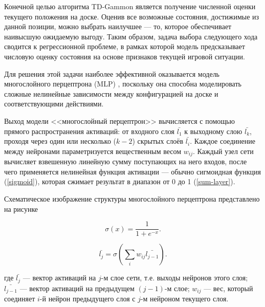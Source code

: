 Конечной целью алгоритма TD-Gammon является получение численной оценки текущего положения на доске. Оценив все возможные состояния, достижимые из данной позиции, можно выбрать наилучшее --- то, которое обеспечивает наивысшую ожидаемую выгоду. Таким образом, задача выбора следующего хода сводится к регрессионной проблеме, в рамках которой модель предсказывает числовую оценку состояния на основе признаков текущей игровой ситуации.

Для решения этой задачи наиболее эффективной оказывается модель многослойного перцептрона (MLP) \cite{mlp}, поскольку она способна моделировать сложные нелинейные зависимости между конфигурацией на доске и соответствующими действиями.

Выход модели <<многослойный перцептрон>> вычисляется с помощью прямого распространения активаций: от входного слоя $\bar{l_1}$ к выходному слою $\bar{l_k}$, проходя через один или несколько ($k - 2$) скрытых слоёв $\bar{l_i}$. Каждое соединение между нейронами параметризуется вещественным весом $w_{ij}$. Каждый узел сети вычисляет взвешенную линейную сумму поступающих на него входов, после чего применяется нелинейная функция активации --- обычно сигмоидная функция (\ref{sigmoid}), которая сжимает результат в диапазон от 0 до 1 (\ref{sum-layer}).

Схематическое изображение структуры многослойного перцептрона представлено на рисунке 


\begin{equation}\label{sigmoid}
    \sigma(x) = \frac{1}{1 + e^{-x}}.
\end{equation}

\begin{equation}\label{sum-layer}
    \bar{l_j}= \sigma \left(\sum_i w_{ij} \bar{l_{j-1}} \right).
\end{equation}

где $\bar{l_j}$ --- вектор активаций на $j$-м слое сети, т.е. выходы нейронов этого слоя; $\bar{l_{j-1}}$ --- вектор активаций на предыдущем $(j-1)$-м слое; $w_{ij}$ --- вес, который соединяет $i$-й нейрон предыдущего слоя с $j$-м нейроном текущего слоя.
